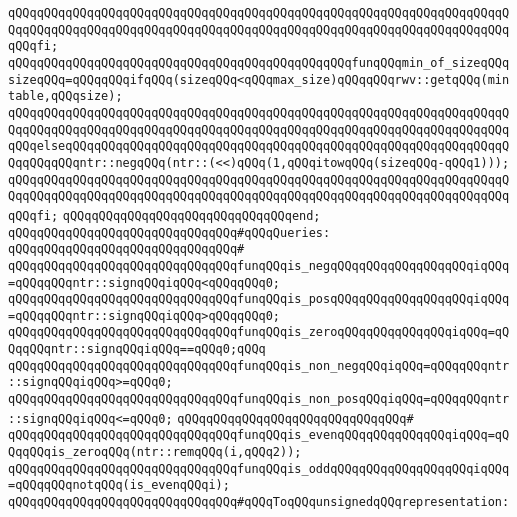 \verb|qQQqqQQqqQQqqQQqqQQqqQQqqQQqqQQqqQQqqQQqqQQqqQQqqQQqqQQqqQQqqQQqqQQqqQQqqQQqqQQqqQQqqQQqqQQqqQQqqQQqqQQqqQQqqQQqqQQqqQQqqQQqqQQqqQQqqQQqqQQqqQQqfi;|\newline
\newline
\verb|qQQqqQQqqQQqqQQqqQQqqQQqqQQqqQQqqQQqqQQqqQQqqQQqfunqQQqmin_of_sizeqQQqsizeqQQq=qQQqqQQqifqQQq(sizeqQQq<qQQqmax_size)qQQqqQQqrwv::getqQQq(mintable,qQQqsize);|\newline
\verb|qQQqqQQqqQQqqQQqqQQqqQQqqQQqqQQqqQQqqQQqqQQqqQQqqQQqqQQqqQQqqQQqqQQqqQQqqQQqqQQqqQQqqQQqqQQqqQQqqQQqqQQqqQQqqQQqqQQqqQQqqQQqqQQqqQQqqQQqqQQqqQQqelseqQQqqQQqqQQqqQQqqQQqqQQqqQQqqQQqqQQqqQQqqQQqqQQqqQQqqQQqqQQqqQQqqQQqqQQqntr::negqQQq(ntr::(<<)qQQq(1,qQQqitowqQQq(sizeqQQq-qQQq1)));|\newline
\verb|qQQqqQQqqQQqqQQqqQQqqQQqqQQqqQQqqQQqqQQqqQQqqQQqqQQqqQQqqQQqqQQqqQQqqQQqqQQqqQQqqQQqqQQqqQQqqQQqqQQqqQQqqQQqqQQqqQQqqQQqqQQqqQQqqQQqqQQqqQQqqQQqfi;|\newline
\verb|qQQqqQQqqQQqqQQqqQQqqQQqqQQqqQQqend;|\newline
\newline
\verb|qQQqqQQqqQQqqQQqqQQqqQQqqQQqqQQq#qQQqQueries:|\newline
\verb|qQQqqQQqqQQqqQQqqQQqqQQqqQQqqQQq#|\newline
\verb|qQQqqQQqqQQqqQQqqQQqqQQqqQQqqQQqfunqQQqis_negqQQqqQQqqQQqqQQqqQQqiqQQq=qQQqqQQqntr::signqQQqiqQQq<qQQqqQQq0;|\newline
\verb|qQQqqQQqqQQqqQQqqQQqqQQqqQQqqQQqfunqQQqis_posqQQqqQQqqQQqqQQqqQQqiqQQq=qQQqqQQqntr::signqQQqiqQQq>qQQqqQQq0;|\newline
\verb|qQQqqQQqqQQqqQQqqQQqqQQqqQQqqQQqfunqQQqis_zeroqQQqqQQqqQQqqQQqiqQQq=qQQqqQQqntr::signqQQqiqQQq==qQQq0;qQQq|\newline
\verb|qQQqqQQqqQQqqQQqqQQqqQQqqQQqqQQqfunqQQqis_non_negqQQqiqQQq=qQQqqQQqntr::signqQQqiqQQq>=qQQq0;|\newline
\verb|qQQqqQQqqQQqqQQqqQQqqQQqqQQqqQQqfunqQQqis_non_posqQQqiqQQq=qQQqqQQqntr::signqQQqiqQQq<=qQQq0;|\newline
\verb|qQQqqQQqqQQqqQQqqQQqqQQqqQQqqQQq#|\newline
\verb|qQQqqQQqqQQqqQQqqQQqqQQqqQQqqQQqfunqQQqis_evenqQQqqQQqqQQqqQQqiqQQq=qQQqqQQqis_zeroqQQq(ntr::remqQQq(i,qQQq2));|\newline
\verb|qQQqqQQqqQQqqQQqqQQqqQQqqQQqqQQqfunqQQqis_oddqQQqqQQqqQQqqQQqqQQqiqQQq=qQQqqQQqnotqQQq(is_evenqQQqi);|\newline
\newline
\verb|qQQqqQQqqQQqqQQqqQQqqQQqqQQqqQQq#qQQqToqQQqunsignedqQQqrepresentation:|\newline
